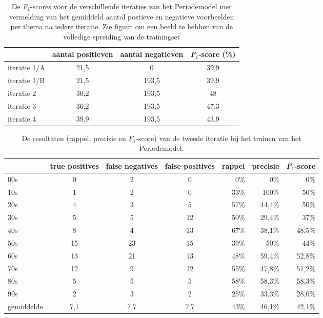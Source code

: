 \begin{table}
	\centering
	\renewcommand\arraystretch{1.2}
	\begin{tabular}{l|cc|c}
		\toprule
		& aantal positieven  &  aantal negatieven &  \textit{F$_{1}$}-score (\%)\\
		\midrule
		iteratie 1/A & 21,5 & 0 & 39,9 \\
		iteratie 1/B & 21,5 & 193,5 & 39,9 \\
		iteratie 2 & 30,2 & 193,5 & 48 \\
		iteratie 3 & 36,2 & 193,5 & 47,3 \\
		iteratie 4 & 39,9 & 193,5 & 43,9 \\
		\bottomrule
	\end{tabular}
	\caption[De \textit{F$_{1}$}-scores voor de verschillende iteraties van het Periodemodel.]{De \textit{F$_{1}$}-scores voor de verschillende iteraties van het Periodemodel met vermelding van het gemiddeld aantal postieve en negatieve voorbeelden per thema na iedere iteratie. Zie figuur om een beeld te hebben van de volledige spreiding van de trainingset}
	\label{tab:validatie-periodemodel}
\end{table}

\begin{table}
	\centering
	\renewcommand\arraystretch{1.2}
	\begin{tabular}{l|ccc|rrr}
		\toprule
		& true positives  & false negatives & false positives & rappel & precisie & \textit{F$_{1}$}-score \\ 
		\midrule
		00s & 0 & 2 & 0 & 0\% & 0\% & 0\% \\ 
		10s & 1 & 2 & 0 &  33\% & 100\% & 50\% \\ 
		20s & 4 & 3 & 5 & 57\% & 44,4\% & 50\% \\ 
		30s & 5 & 5 & 12 & 50\% & 29,4\% & 37\% \\ 
		40s & 8 & 4 & 13  & 67\% & 38,1\% & 48,5\% \\ 
		50s & 15 & 23 & 15  & 39\% & 50\% & 44\% \\ 
		60s & 13 & 21 & 13  & 48\% & 59,4\% & 52,8\% \\ 
		70s & 12 & 9 & 12  & 55\% & 47,8\% & 51,2\% \\ 
		80s & 5 & 5 & 5  & 58\% & 58,3\% & 58,3\% \\ 
		90s & 2 & 3 & 2  & 25\% & 33,3\% & 28,6\% \\ 
		\midrule
		gemiddelde & 7,1 & 7,7 & 7,7  & 43\% & 46,1\% & 42,1\% \\ 
		\bottomrule
	\end{tabular} 
	\caption{De resultaten (rappel, precisie en \textit{$F_{1}$}-score) van de tweede iteratie bij het trainen van het Periodemodel.}
	\label{tab:validatie-iteratie2-periodemodel}
\end{table}

